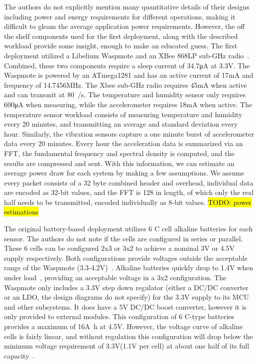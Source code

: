 The authors do not explicitly mention many quantitative details of their designs including power and energy requirements for different operations, making it difficult to gleam the average application power requirements.
However, the off the shelf components used for the first deployment, along with the described workload provide some insight, enough to make an educated guess.
The first deployment utilized a Libelium Waspmote and an XBee 868LP sub-\si{\giga\hertz} radio~\cite{waspmote,xbeeradio}.
Combined, these two components require a sleep current of 34.7\si{\micro\ampere} at 3.3\si{\volt}.
The Waspmote is powered by an ATmega1281 and has an active current of 17\si{\milli\ampere} and frequency of 14.7456\si{\mega\hertz}.
The Xbee sub-\si{\giga\hertz} radio requires 45\si{\milli\ampere} when active and can transmit at 80\si[per-mode=symbol]{\kilo\bit\per\second}.
The temperature and humidity sensor only requires 600\si{\micro\ampere} when measuring, while the accelerometer requires 18\si{\milli\ampere} when active.
The temperature sensor workload consists of measuring temperature and humidity every 20 minutes, and transmitting an average and standard deviation every hour. 
Similarly, the vibration sensors capture a one minute burst of accelerometer data every 20 minutes.
Every hour the acceleration data is summarized via an FFT, the fundamental frequency and spectral density is computed, and the results are compressed and sent.
With this information, we can estimate an average power draw for each system by making a few assumptions.
We assume every packet consists of a 32 byte combined header and overhead, individual data are encoded as 32-bit values, and the FFT is 128 in length, of which only the real half needs to be transmitted, encoded individually as 8-bit values. \hl{TODO: power estimations}

The original battery-based deployment utilizes 6 C cell alkaline batteries for each sensor.
The authors do not note if the cells are configured in series or parallel.
These 6 cells can be configured 2x3 or 3x2 to achieve a nominal 3\si{\volt} or 4.5\si{\volt} supply respectively.
Both configurations provide voltages outside the acceptable range of the Waspmote (3.3-4.2\si{\volt})~\cite{waspmote_block}.
Alkaline batteries quickly drop to 1.4\si{\V} when under load~\cite{alkaline_c}, providing an acceptable voltage in a 3x2 configuration.
The Waspmote only includes a 3.3\si{\volt} step down regulator (either a DC/DC converter or an LDO, the design diagrams do not specify) for the 3.3\si{\volt} supply to its MCU and other subsystems.
It does have a 5\si{\volt} DC/DC boost converter, however it is only provided to external modules. 
This configuration of 6 C-type batteries provides a maximum of 16\si{\ampere\hour} at 4.5V.
However, the voltage curve of alkaline cells is fairly linear, and without regulation this configuration will drop below the minimum voltage requirement of 3.3\si{\volt}(1.1\si{V} per cell) at about one half of its full capacity~\cite{alkaline_c}.

